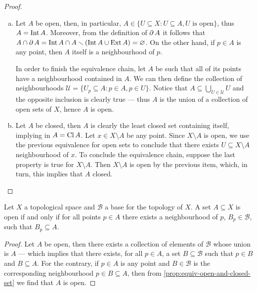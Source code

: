 \begin{proof}
    \begin{enumerate}[(a)]\setlength\itemsep{0em}
        \item Let \(A\) be open, then, in particular,
              \(A \in \{U \subseteq X \colon U \subseteq A, U \text{ is open}\}\), thus
              \(A = \operatorname{Int} A\). Moreover, from the definition of \(\operatorname{\partial} A\) it follows that
              \(A \cap \operatorname{\partial} A = \operatorname{Int} A \cap A \smallsetminus (\operatorname{Int} A \cup \operatorname{Ext} A) =
              \varnothing\). On the other hand, if \(p \in A\) is any point, then \(A\) itself
              is a neighbourhood of \(p\).

              In order to finish the equivalence chain, let \(A\) be such that all of its
              points have a neighbourhood contained in \(A\). We can then define the
              collection of neighbourhoods
              \(\mathcal U = \{U_p \subseteq A \colon p \in A, p \in U\}\). Notice that
              \(A \subseteq \bigcup_{U \in \mathcal U} U\) and the opposite inclusion is
              clearly true --- thus \(A\) is the union of a collection of open sets of
              \(X\), hence \(A\) is open.

        \item Let \(A\) be closed, then \(A\) is clearly the least closed set containing
              itself, implying in \(A = \operatorname{Cl} A\). Let \(x \in X \setminus A\) be any
              point. Since \(X \setminus A\) is open, we use the previous equivalence for
              open sets to conclude that there exists \(U \subseteq X \setminus A\)
              neighbourhood of \(x\).  To conclude the equivalence chain, suppose the last
              property is true for \(X \setminus A\). Then \(X \setminus A\) is open by the
              previous item, which, in turn, this implies that \(A\) closed.
    \end{enumerate}
\end{proof}

\begin{proposition}
    Let \(X\) a topological space and \(\mathcal B\) a base for the topology of
    \(X\). A set \(A \subseteq X\) is open if and only if for all points \(p \in
    A\) there exists a neighbourhood of \(p\), \(B_p \in \mathcal B\), such that
    \(B_p \subseteq A\).
\end{proposition}

\begin{proof}
    Let \(A\) be open, then there exists a collection of elements of \(\mathcal B\)
    whose union is \(A\) --- which implies that there exists, for all \(p \in A\), a
    set \(B \subseteq \mathcal B\) such that \(p \in B\) and \(B \subseteq
    A\). For the contrary, if \(p \in A\) is any point and \(B \in \mathcal B\) is
    the corresponding neighbourhood \(p \in B \subseteq A\), then from
    \cref{prop:equiv-open-and-closed-set} we find that \(A\) is open.
\end{proof}

